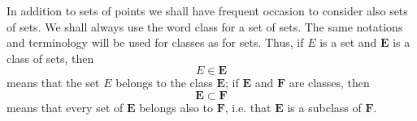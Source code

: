 In addition to sets of points we shall have frequent occasion to consider also sets of sets. We shall always use the word class for a set of sets. The same notations and terminology will be used for classes as for sets. Thus, if $E$ is a set and $\mathbf{E}$ is a class of sets, then
$$E \in \mathbf{E}$$
means that the set $E$ belongs to the class $\mathbf{E}$; if $\mathbf{E}$ and $\mathbf{F}$ are classes, then
$$\mathbf{E} \subset \mathbf{F}$$
means that every set of $\mathbf{E}$ belongs also to $\mathbf{F}$, i.e. that $\mathbf{E}$ is a subclass of $\mathbf{F}$.
